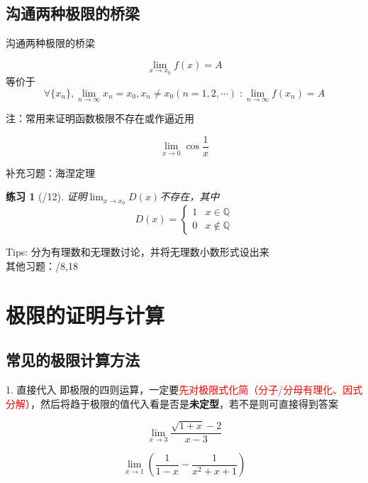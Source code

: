 \documentclass[UTF8]{ctexbeamer}
\newtheorem{exercise}[theorem]{练习} %
\begin{document}
\subsection{沟通两种极限的桥梁}
\begin{frame}{沟通两种极限的桥梁}
\begin{theorem}[海涅定理]
\[\lim_{x\to x_0}f(x)=A\]
等价于\[\forall\{x_n\},\lim_{n\to\infty}x_n=x_0,x_n\ne x_0(n=1,2,\cdots)\;:\lim_{n\to \infty}f(x_n)=A\]
\end{theorem}
注：常用来证明函数极限不存在或作逼近用
\begin{example}[\textsection 3.3/11]
\[\lim_{x\to 0}\cos\frac{1}{x}\]
\end{example}
\end{frame}

\begin{frame}{补充习题：海涅定理}
\begin{exercise}[/12]
证明$\lim_{x\to x_0}D(x)$不存在，其中
\[D(x)=\begin{cases}1&x\in\mathbb{Q}\\0&x\notin\mathbb{Q}\end{cases}\]
\end{exercise}
Tips: 分为有理数和无理数讨论，并将无理数小数形式设出来\\
其他习题：/8,18
\end{frame}


\section{极限的证明与计算}
\begin{frame}
\sectionpage
\end{frame}

\subsection{常见的极限计算方法}
\begin{frame}
\subsectionpage
\end{frame}

\begin{frame}{1. 直接代入}
即极限的四则运算，一定要\textcolor{red}{先对极限式化简（分子/分母有理化、因式分解）}，然后将趋于极限的值代入看是否是\textbf{未定型}，若不是则可直接得到答案
\begin{example}[\textsection 3.3/2(5)]
\[\lim_{x\to 3}\frac{\sqrt{1+x}-2}{x-3}\]
\end{example}
\begin{example}[17数分期中]
\[\lim_{x\to 1}\left(\frac{1}{1-x}-\frac{1}{x^2+x+1}\right)\]
\end{example}
\end{frame}
\end{document}
